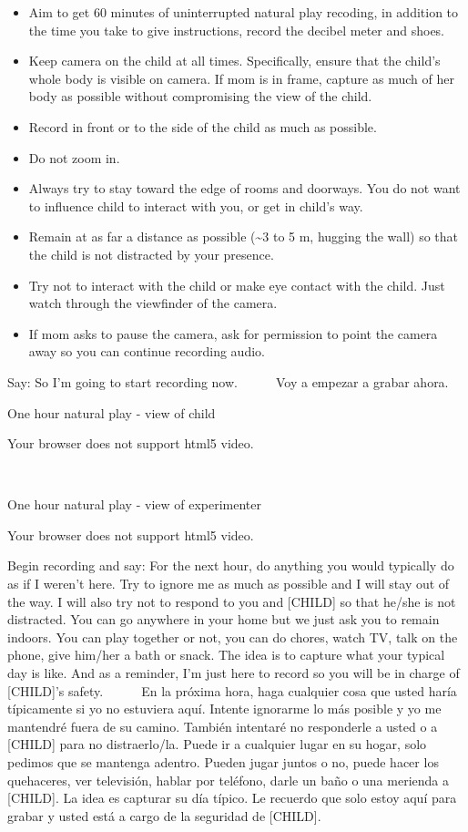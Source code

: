 \documentclass[
]{book}
\providecommand{\tightlist}{%
  \setlength{\itemsep}{0pt}\setlength{\parskip}{0pt}}
\begin{document}
\begin{itemize}
\tightlist
\item
  Aim to get 60 minutes of uninterrupted natural play recoding, in addition to the time you take to give instructions, record the decibel meter and shoes.
\item
  Keep camera on the child at all times. Specifically, ensure that the child's whole body is visible on camera. If mom is in frame, capture as much of her body as possible without compromising the view of the child.
\item
  Record in front or to the side of the child as much as possible.
\item
  Do not zoom in.
\item
  Always try to stay toward the edge of rooms and doorways. You do not want to influence child to interact with you, or get in child's way.
\item
  Remain at as far a distance as possible (\textasciitilde3 to 5 m, hugging the wall) so that the child is not distracted by your presence.
\item
  Try not to interact with the child or make eye contact with the child. Just watch through the viewfinder of the camera.
\item
  If mom asks to pause the camera, ask for permission to point the camera away so you can continue recording audio.
\end{itemize}

Say: So I'm going to start recording now.
    Voy a empezar a grabar ahora.

One hour natural play - view of child

Your browser does not support html5 video.

 

One hour natural play - view of experimenter

Your browser does not support html5 video.

Begin recording and say: For the next hour, do anything you would typically do as if I weren't here. Try to ignore me as much as possible and I will stay out of the way. I will also try not to respond to you and {[}CHILD{]} so that he/she is not distracted. You can go anywhere in your home but we just ask you to remain indoors. You can play together or not, you can do chores, watch TV, talk on the phone, give him/her a bath or snack. The idea is to capture what your typical day is like. And as a reminder, I'm just here to record so you will be in charge of {[}CHILD{]}'s safety.
    En la próxima hora, haga cualquier cosa que usted haría típicamente si yo no estuviera aquí. Intente ignorarme lo más posible y yo me mantendré fuera de su camino. También intentaré no responderle a usted o a {[}CHILD{]} para no distraerlo/la. Puede ir a cualquier lugar en su hogar, solo pedimos que se mantenga adentro. Pueden jugar juntos o no, puede hacer los quehaceres, ver televisión, hablar por teléfono, darle un baño o una merienda a {[}CHILD{]}. La idea es capturar su día típico. Le recuerdo que solo estoy aquí para grabar y usted está a cargo de la seguridad de {[}CHILD{]}.
\end{document}
